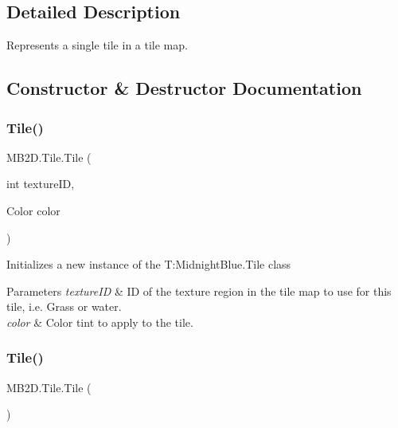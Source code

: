 \subsection{Detailed Description}
Represents a single tile in a tile map. 



\subsection{Constructor \& Destructor Documentation}
\hypertarget{class_m_b2_d_1_1_tile_ab9e2260dc2c752c36a248660d99b0e34}{}\label{class_m_b2_d_1_1_tile_ab9e2260dc2c752c36a248660d99b0e34} 
\subsubsection{\texorpdfstring{Tile()}{Tile()}\hspace{0.1cm}{\footnotesize\ttfamily [1/2]}}
{\footnotesize\ttfamily M\+B2\+D.\+Tile.\+Tile (\begin{DoxyParamCaption}\item[{int}]{texture\+ID,  }\item[{Color}]{color }\end{DoxyParamCaption})\hspace{0.3cm}{\ttfamily [inline]}}



Initializes a new instance of the T\+:\+Midnight\+Blue.\+Tile class 


\begin{DoxyParams}{Parameters}
{\em texture\+ID} & ID of the texture region in the tile map to use for this tile, i.\+e. Grass or water.\\
\hline
{\em color} & Color tint to apply to the tile.\\
\hline
\end{DoxyParams}
\hypertarget{class_m_b2_d_1_1_tile_a9bd9f08b191b87916f209ac7b9ce989c}{}\label{class_m_b2_d_1_1_tile_a9bd9f08b191b87916f209ac7b9ce989c} 
\subsubsection{\texorpdfstring{Tile()}{Tile()}\hspace{0.1cm}{\footnotesize\ttfamily [2/2]}}
{\footnotesize\ttfamily M\+B2\+D.\+Tile.\+Tile (\begin{DoxyParamCaption}{ }\end{DoxyParamCaption})\hspace{0.3cm}{\ttfamily [inline]}}



